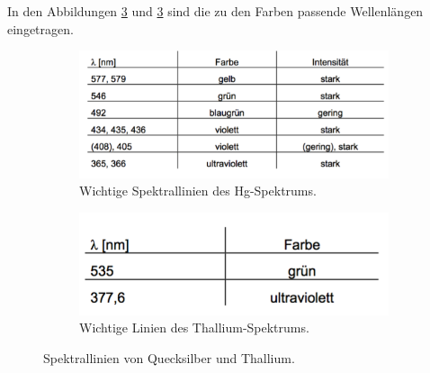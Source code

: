 In den Abbildungen \ref{fig:linien} und
\ref{fig:linien} sind die zu den Farben passende
Wellenlängen eingetragen.


\begin{figure}[H]
  \centering
  \begin{subfigure}{0.48\textwidth}
    \centering
    \includegraphics[width = \textwidth]{NacktbilderMilaKunis/linienhg.pdf}
    \caption{Wichtige Spektrallinien des Hg-Spektrums\cite{anleitung}.}
    \label{fig:linienhg}
  \end{subfigure}
  \begin{subfigure}{0.48\textwidth}
    \centering
    \includegraphics[width = \textwidth]{NacktbilderMilaKunis/linienthallium.pdf}
    \caption{Wichtige Linien des Thallium-Spektrums\cite{anleitung}.}
    \label{fig:linienthallium}
  \end{subfigure}
  \caption{Spektrallinien von Quecksilber und Thallium.}
  \label{fig:linien}
\end{figure}

